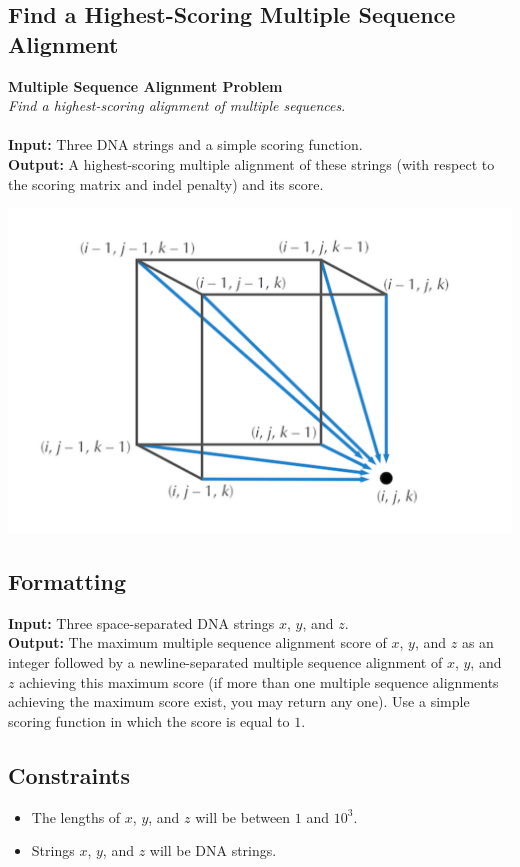 \documentclass{article}
\begin{document}
\subsection{Find a Highest-Scoring Multiple Sequence Alignment}
\hline\vspace{5}
\textbf{Multiple Sequence Alignment Problem}\\
\emph{Find a highest-scoring alignment of multiple sequences}.\\ \\
\textbf{Input:} Three DNA strings and a simple scoring function.\\
\textbf{Output:} A highest-scoring multiple alignment of these strings (with respect to the scoring matrix and indel penalty) and its score.
\begin{center}
    \includegraphics[scale=0.24]{c5/logos/5M.png}
\end{center}
\hline\vspace{5}

\subsection*{Formatting}
\noindent\textbf{Input:} Three space-separated DNA strings $x$, $y$, and $z$.\\
\noindent\textbf{Output:} The maximum multiple sequence alignment score of $x$, $y$, and $z$ as an integer followed by a newline-separated multiple sequence alignment of $x$, $y$, and $z$ achieving this maximum score (if more than one multiple sequence alignments achieving the maximum score exist, you may return any one). Use a simple scoring function in which the score is equal to $1$.

\subsection*{Constraints}
\begin{itemize}
    \item The lengths of $x$, $y$, and $z$ will be between $1$ and $10^3$.
    \item Strings $x$, $y$, and $z$ will be DNA strings.
\end{itemize}
\pagebreak
\end{document}
